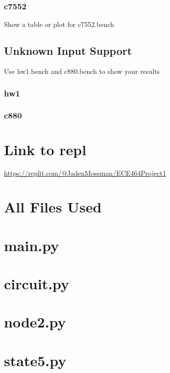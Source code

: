 \documentclass{article}
\begin{document}
                \subsubsection{c7552}
                Show a table or plot for c7552.bench
                
            
            \subsection{Unknown Input Support}
            Use hw1.bench and c880.bench to show your results
                \subsubsection{hw1}
                
                \subsubsection{c880}


    \section{Link to repl}
        \url{https://replit.com/@JadenMossman/ECE464Project1}
    
    \newpage
    \section{All Files Used}
        \newcommand{\FileUsed}[1]{\section*{ #1 }}
        \FileUsed{main.py}
        \FileUsed{circuit.py}
        \FileUsed{node2.py}
        \FileUsed{state5.py}
\end{document}
